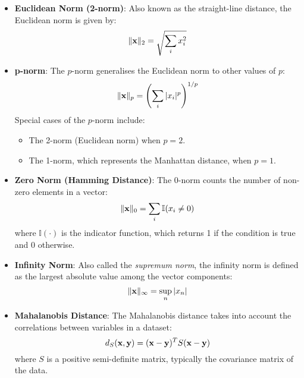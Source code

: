 \begin{itemize}
    \item \textbf{Euclidean Norm (2-norm)}: Also known as the straight-line distance, the Euclidean norm is given by:
          \begin{equation}
              \| \mathbf{x} \|_2 = \sqrt{\sum_i x_i^2}
          \end{equation}

    \item \textbf{p-norm}: The \( p \)-norm generalises the Euclidean norm to other values of \( p \):
          \begin{equation}
              \| \mathbf{x} \|_p = \left( \sum_i |x_i|^p \right)^{1/p}
          \end{equation}
          Special cases of the \( p \)-norm include:
          \begin{itemize}
              \item The 2-norm (Euclidean norm) when \( p = 2 \).
              \item The 1-norm, which represents the Manhattan distance, when \( p = 1 \).
          \end{itemize}

    \item \textbf{Zero Norm (Hamming Distance)}: The 0-norm counts the number of non-zero elements in a vector:
          \begin{equation}
              \| \mathbf{x} \|_0 = \sum_i \mathbb{I}(x_i \neq 0)
          \end{equation}
          where \( \mathbb{I}(\cdot) \) is the indicator function, which returns 1 if the condition is true and 0 otherwise.

    \item \textbf{Infinity Norm}: Also called the \textit{supremum norm}, the infinity norm is defined as the largest absolute value among the vector components:
          \begin{equation}
              \| \mathbf{x} \|_\infty = \sup_n |x_n|
          \end{equation}

    \item \textbf{Mahalanobis Distance}: The Mahalanobis distance takes into account the correlations between variables in a dataset:
          \begin{equation}
              d_S(\mathbf{x}, \mathbf{y}) = (\mathbf{x} - \mathbf{y})^T S (\mathbf{x} - \mathbf{y})
          \end{equation}
          where \( S \) is a positive semi-definite matrix, typically the covariance matrix of the data.

\end{itemize}



